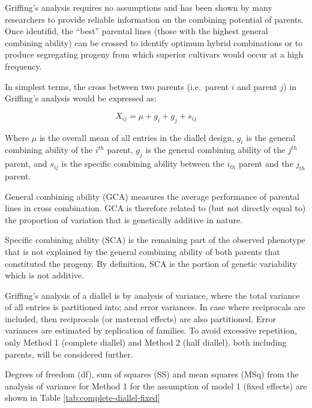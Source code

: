 \documentclass[nofonts,]{tufte-handout}
\begin{document}
Griffing's analysis requires no assumptions and has been shown by many
researchers to provide reliable information on the combining potential
of parents. Once identifid, the ``best'' parental lines (those with the
highest general combining ability) can be crossed to identify optimum
hybrid combinations or to produce segregating progeny from which
superior cultivars would occur at a high frequency.

In simplest terms, the cross between two parents (i.e.~parent \(i\) and
parent \(j\)) in Griffing's analysis would be expressed as:

\[
X_{ij} = \mu + g_i + g_j + s_{ij}
\]

Where \(\mu\) is the overall mean of all entries in the diallel design,
\(g_i\) is the general combining ability of the \(i^{th}\) parent,
\(g_j\) is the general combining ability of the \(j^{th}\) parent, and
\(s_{ij}\) is the specific combining ability between the \(i_{th}\)
parent and the \(j_{th}\) parent.

General combining ability (GCA) measures the average performance of
parental lines in cross combination. GCA is therefore related to (but
not directly equal to) the proportion of variation that is genetically
additive in nature.

Specific combining ability (SCA) is the remaining part of the observed
phenotype that is not explained by the general combining ability of both
parents that constituted the progeny. By definition, SCA is the portion
of genetic variability which is not additive.

Griffing's analysis of a diallel is by analysis of variance, where the
total variance of all entries is partitioned into; and error variances.
In case where reciprocals are included, then reciprocals (or maternal
effects) are also partitioned. Error variances are estimated by
replication of families. To avoid excessive repetition, only Method 1
(complete diallel) and Method 2 (half diallel), both including parents,
will be considered further.

Degrees of freedom (df), sum of squares (SS) and mean squares (MSq) from
the analysis of variance for Method 1 for the assumption of model 1
(fixed effects) are shown in Table \ref{tab:complete-diallel-fixed}
\end{document}

